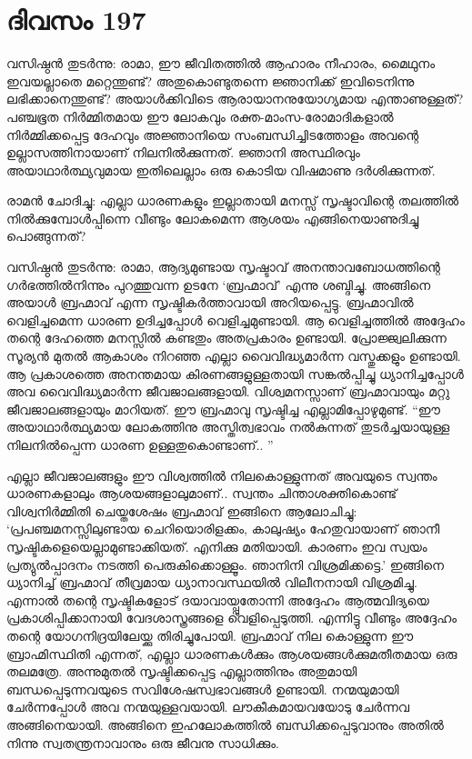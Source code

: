 \section{ദിവസം 197}


വസിഷ്ഠൻ തുടർന്നു: രാമാ, ഈ ജീവിതത്തിൽ ആഹാരം നീഹാരം, മൈഥുനം ഇവയല്ലാതെ മറ്റെന്തുണ്ട്? അതുകൊണ്ടുതന്നെ ജ്ഞാനിക്ക് ഇവിടെനിന്നു ലഭിക്കാനെന്തുണ്ട്? അയാൾക്കിവിടെ ആരായാനനുയോഗ്യമായ എന്താണുള്ളത്? പഞ്ചഭൂത നിർമ്മിതമായ ഈ ലോകവും രക്ത-മാംസ-രോമാദികളാൽ നിർമ്മിക്കപ്പെട്ട ദേഹവും അജ്ഞാനിയെ സംബന്ധിച്ചിടത്തോളം അവന്റെ ഉല്ലാസത്തിനായാണ്‌ നിലനിൽക്കുന്നത്. ജ്ഞാനി അസ്ഥിരവും അയാഥാർത്ഥ്യവുമായ ഇതിലെല്ലാം ഒരു കൊടിയ വിഷമാണു ദർശിക്കുന്നത്.

രാമൻ ചോദിച്ചു: എല്ലാ ധാരണകളും ഇല്ലാതായി മനസ്സ് സൃഷ്ടാവിന്റെ തലത്തിൽ നിൽക്കുമ്പോൾപ്പിന്നെ വീണ്ടും ലോകമെന്ന ആശയം എങ്ങിനെയാണുദിച്ചു പൊങ്ങുന്നത്?

വസിഷ്ഠൻ തുടർന്നു: രാമാ, ആദ്യമുണ്ടായ സൃഷ്ടാവ് അനന്താവബോധത്തിന്റെ ഗർഭത്തിൽനിന്നും പുറത്തുവന്ന ഉടനേ ‘ബ്രഹ്മാവ്’ എന്നു ശബ്ദിച്ചു. അങ്ങിനെ അയാൾ ബ്രഹ്മാവ് എന്ന സൃഷ്ടികർത്താവായി അറിയപ്പെട്ടു. ബ്രഹ്മാവിൽ വെളിച്ചമെന്ന ധാരണ ഉദിച്ചപ്പോൾ വെളിച്ചമുണ്ടായി. ആ വെളിച്ചത്തിൽ അദ്ദേഹം തന്റെ ദേഹത്തെ മനസ്സിൽ കണ്ടതും അതപ്രകാരം ഉണ്ടായി. പ്രോജ്ജ്വലിക്കുന്ന സൂര്യൻ മുതൽ ആകാശം നിറഞ്ഞ എല്ലാ വൈവിദ്ധ്യമാർന്ന വസ്തുക്കളും ഉണ്ടായി. ആ പ്രകാശത്തെ അനന്തമായ കിരണങ്ങളുള്ളതായി സങ്കൽപ്പിച്ചു ധ്യാനിച്ചപ്പോൾ അവ വൈവിദ്ധ്യമാർന്ന ജീവജാലങ്ങളായി. വിശ്വമനസ്സാണ്‌ ബ്രഹ്മാവായും മറ്റു ജീവജാലങ്ങളായും മാറിയത്. ഈ ബ്രഹ്മാവു സൃഷ്ടിച്ച എല്ലാമിപ്പോഴുമുണ്ട്. “ഈ അയാഥാർത്ഥ്യമായ ലോകത്തിനു അസ്തിത്വഭാവം നൽകുന്നത് തുടർച്ചയായുള്ള നിലനിൽപ്പെന്ന ധാരണ ഉള്ളതുകൊണ്ടാണ്‌.. ”

എല്ലാ ജീവജാലങ്ങളും ഈ വിശ്വത്തിൽ നിലകൊള്ളുന്നത് അവയുടെ സ്വന്തം ധാരണകളാലും ആശയങ്ങളാലുമാണ്‌.. സ്വന്തം ചിന്താശക്തികൊണ്ട് വിശ്വനിർമ്മിതി ചെയ്തശേഷം ബ്രഹ്മാവ് ഇങ്ങിനെ ആലോചിച്ചു: ‘പ്രപഞ്ചമനസ്സിലുണ്ടായ ചെറിയൊരിളക്കം, കാലുഷ്യം ഹേതുവായാണ്‌ ഞാനീ സൃഷ്ടികളെയെല്ലാമുണ്ടാക്കിയത്. എനിക്കു മതിയായി. കാരണം ഇവ സ്വയം പ്രത്യുൽപ്പാദനം നടത്തി പെരുകിക്കൊള്ളൂം. ഞാനിനി വിശ്രമിക്കട്ടെ.’ ഇങ്ങിനെ ധ്യാനിച്ച് ബ്രഹ്മാവ് തീവ്രമായ ധ്യാനാവസ്ഥയിൽ വിലീനനായി വിശ്രമിച്ചു. എന്നാൽ തന്റെ സൃഷ്ടികളോട് ദയാവായ്പ്പുതോന്നി അദ്ദേഹം ആത്മവിദ്യയെ പ്രകാശിപ്പിക്കാനായി വേദശാസ്ത്രങ്ങളെ വെളിപ്പെടുത്തി. എന്നിട്ടു വീണ്ടും അദ്ദേഹം തന്റെ യോഗനിദ്രയിലേയ്ക്കു തിരിച്ചുപോയി. ബ്രഹ്മാവ്‌ നില കൊള്ളുന്ന ഈ ബ്രാഹ്മിസ്ഥിതി എന്നത്, എല്ലാ ധാരണകൾക്കും ആശയങ്ങൾക്കുമതീതമായ ഒരു തലമത്രേ. അന്നുമുതൽ സൃഷ്ടിക്കപ്പെട്ട എല്ലാത്തിനും അതുമായി ബന്ധപ്പെടുന്നവയുടെ സവിശേഷസ്വഭാവങ്ങൾ ഉണ്ടായി. നന്മയുമായി ചേർന്നപ്പോള്‍ അവ നന്മയുള്ളവയായി. ലൗകീകമായവയോടു ചേർന്നവ അങ്ങിനെയായി. അങ്ങിനെ ഇഹലോകത്തിൽ ബന്ധിക്കപ്പെടുവാനും അതിൽ നിന്നു സ്വതന്ത്രനാവാനും ഒരു ജീവനു സാധിക്കും. 
